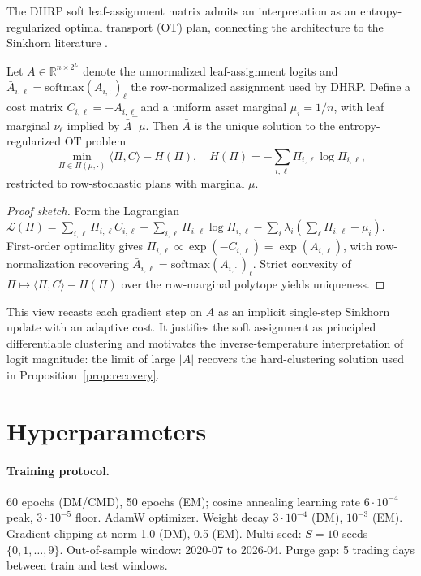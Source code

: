 The DHRP soft leaf-assignment matrix admits an interpretation as an
entropy-regularized optimal transport (OT) plan, connecting the
architecture to the Sinkhorn literature \citep{Cuturi2013Sinkhorn}.

\begin{proposition}
\label{prop:ot}
Let $A \in \mathbb{R}^{n \times 2^L}$ denote the unnormalized
leaf-assignment logits and $\bar A_{i,\ell} =
\mathrm{softmax}(A_{i,:})_\ell$ the row-normalized assignment used by
DHRP. Define a cost matrix $C_{i,\ell} = -A_{i,\ell}$ and a uniform
asset marginal $\mu_i = 1/n$, with leaf marginal $\nu_\ell$ implied
by $\bar A^\top \mu$. Then $\bar A$ is the unique solution to the
entropy-regularized OT problem
\[
\min_{\Pi \in \Pi(\mu, \cdot)} \langle \Pi, C \rangle - H(\Pi),
\quad H(\Pi) = -\sum_{i,\ell} \Pi_{i,\ell} \log \Pi_{i,\ell},
\]
restricted to row-stochastic plans with marginal $\mu$.
\end{proposition}

\begin{proof}[Proof sketch]
Form the Lagrangian
$\mathcal{L}(\Pi) = \sum_{i,\ell} \Pi_{i,\ell} C_{i,\ell}
+ \sum_{i,\ell} \Pi_{i,\ell} \log \Pi_{i,\ell}
- \sum_i \lambda_i (\sum_\ell \Pi_{i,\ell} - \mu_i)$.
First-order optimality gives $\Pi_{i,\ell} \propto \exp(-C_{i,\ell})
= \exp(A_{i,\ell})$, with row-normalization recovering
$\bar A_{i,\ell} = \mathrm{softmax}(A_{i,:})_\ell$. Strict convexity
of $\Pi \mapsto \langle \Pi, C\rangle - H(\Pi)$ over the row-marginal
polytope yields uniqueness.
\end{proof}

This view recasts each gradient step on $A$ as an implicit single-step
Sinkhorn update with an adaptive cost. It justifies the soft assignment
as principled differentiable clustering and motivates the
inverse-temperature interpretation of logit magnitude: the limit of
large $|A|$ recovers the hard-clustering solution used in
Proposition~\ref{prop:recovery}.

\section{Hyperparameters}
\label{app:hyperparams}



\paragraph{Training protocol.} 60 epochs (DM/CMD), 50 epochs (EM); cosine
annealing learning rate $6 \cdot 10^{-4}$ peak, $3 \cdot 10^{-5}$ floor.
AdamW optimizer. Weight decay $3 \cdot 10^{-4}$ (DM), $10^{-3}$ (EM).
Gradient clipping at norm 1.0 (DM), 0.5 (EM). Multi-seed: $S = 10$ seeds
$\{0, 1, \ldots, 9\}$. Out-of-sample window: 2020-07 to 2026-04.
Purge gap: 5 trading days between train and test windows.

